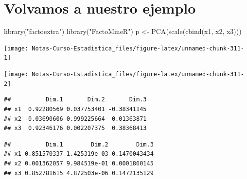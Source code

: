 \documentclass[
  12pt,
]{book}
\newenvironment{Shaded}{\begin{snugshade}}{\end{snugshade}}
\newcommand{\FunctionTok}[1]{\textcolor[rgb]{0.00,0.00,0.00}{#1}}
\newcommand{\NormalTok}[1]{#1}
\newcommand{\OtherTok}[1]{\textcolor[rgb]{0.56,0.35,0.01}{#1}}
\newcommand{\SpecialCharTok}[1]{\textcolor[rgb]{0.00,0.00,0.00}{#1}}
\newcommand{\StringTok}[1]{\textcolor[rgb]{0.31,0.60,0.02}{#1}}
\theoremstyle{definition}
\theoremstyle{definition}
\theoremstyle{definition}
\theoremstyle{remark}
\begin{document}
\hypertarget{volvamos-a-nuestro-ejemplo}{%
\section{Volvamos a nuestro ejemplo}\label{volvamos-a-nuestro-ejemplo}}

\begin{Shaded}
\begin{Highlighting}[]
\FunctionTok{library}\NormalTok{(}\StringTok{"factoextra"}\NormalTok{)}
\FunctionTok{library}\NormalTok{(}\StringTok{"FactoMineR"}\NormalTok{)}
\NormalTok{p }\OtherTok{\textless{}{-}} \FunctionTok{PCA}\NormalTok{(}\FunctionTok{scale}\NormalTok{(}\FunctionTok{cbind}\NormalTok{(x1, x2, x3)))}
\end{Highlighting}
\end{Shaded}

\begin{center}\texttt{[image: Notas-Curso-Estadistica\_files/figure-latex/unnamed-chunk-311-1]} \end{center}

\begin{center}\texttt{[image: Notas-Curso-Estadistica\_files/figure-latex/unnamed-chunk-311-2]} \end{center}

\begin{Shaded}
\end{Shaded}

\begin{verbatim}
##          Dim.1       Dim.2       Dim.3
## x1  0.92280569 0.037753401 -0.38341145
## x2 -0.03690606 0.999225664  0.01363871
## x3  0.92346176 0.002207375  0.38368413
\end{verbatim}

\begin{Shaded}
\end{Shaded}

\begin{verbatim}
##          Dim.1        Dim.2        Dim.3
## x1 0.851570337 1.425319e-03 0.1470043434
## x2 0.001362057 9.984519e-01 0.0001860145
## x3 0.852781615 4.872503e-06 0.1472135129
\end{verbatim}
\end{document}
